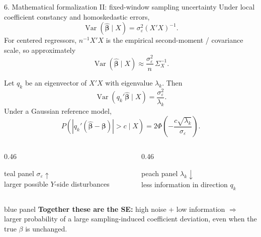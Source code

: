 \documentclass[aspectratio=169,10pt]{beamer}
\newenvironment{tealpanel}{\begin{beamercolorbox}[wd=\linewidth,sep=0.16cm,rounded=true]{teal panel}}{\end{beamercolorbox}}
\newenvironment{peachpanel}{\begin{beamercolorbox}[wd=\linewidth,sep=0.16cm,rounded=true]{peach panel}}{\end{beamercolorbox}}
\newenvironment{bluepanel}{\begin{beamercolorbox}[wd=\linewidth,sep=0.16cm,rounded=true]{blue panel}}{\end{beamercolorbox}}
\begin{document}
\begin{frame}{6. Mathematical formalization II: fixed-window sampling uncertainty}
\scriptsize
Under local coefficient constancy and homoskedastic errors,
\[
\boxed{\operatorname{Var}(\hat{\bm\beta}\mid X)=\sigma_\varepsilon^2(X'X)^{-1}.}
\]
For centered regressors, $n^{-1}X'X$ is the empirical second-moment / covariance scale, so approximately
\[
\boxed{\operatorname{Var}(\hat{\bm\beta}\mid X)\approx
\frac{\sigma_\varepsilon^2}{n}\,\Sigma_X^{-1}.}
\]

Let $q_k$ be an eigenvector of $X'X$ with eigenvalue $\lambda_k$. Then
\[
\boxed{\operatorname{Var}(q_k'\hat{\bm\beta}\mid X)=\frac{\sigma_\varepsilon^2}{\lambda_k}.}
\]
Under a Gaussian reference model,
\[
P\!\left(|q_k'(\hat{\bm\beta}-\bm\beta)|>c\mid X\right)
=2\Phi\!\left(-\frac{c\sqrt{\lambda_k}}{\sigma_\varepsilon}\right).
\]

\begin{columns}[T,onlytextwidth]
\begin{column}{0.46\textwidth}
\begin{tealpanel}
\centering
$\sigma_\varepsilon\uparrow$\\
larger possible $Y$-side disturbances
\end{tealpanel}
\end{column}
\begin{column}{0.46\textwidth}
\begin{peachpanel}
\centering
$\lambda_k\downarrow$\\
less information in direction $q_k$
\end{peachpanel}
\end{column}
\end{columns}

\vspace{0.08cm}
\begin{bluepanel}
\centering
\textbf{Together these are the SE:} high noise + low information $\Rightarrow$ larger probability of a large sampling-induced coefficient deviation, even when the true $\beta$ is unchanged.
\end{bluepanel}
\end{frame}
\end{document}
